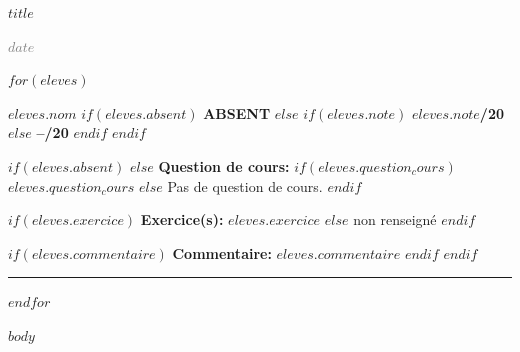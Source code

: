 \documentclass[11pt,a4paper]{article}
\newcommand{\colletitle}{$title$}
\newcommand{\colletitle}{Colle de mathématiques}
\newcommand{\colledate}{$date$}
\newcommand{\colledate}{\today}
\begin{document}

\begin{center}

{\Large\bfseries\color{CPGEblue}\colletitle}


\vspace{0.5em}

{\small\textcolor{gray}{\colledate}}

\end{center}

\vspace{0.7em}


$for(eleves)$

\noindent
\colorbox{CPGElight}{
\parbox{\dimexpr\textwidth-2\fboxsep\relax}{
\textbf{\large $eleves.nom$}
\hfill
$if(eleves.absent)$
\textcolor{CPGEgray}{\textbf{ABSENT}}
$else$
$if(eleves.note)$
\textbf{\large $eleves.note$/20}
$else$
\textbf{\large --/20}
$endif$
$endif$
}}

$if(eleves.absent)$
$else$
\textbf{Question de cours:}
$if(eleves.question_cours)$
$eleves.question_cours$
$else$
\textcolor{CPGEgray}{Pas de question de cours.}
$endif$

\vspace{0.25em}

$if(eleves.exercice)$
\textbf{Exercice(s):}
$eleves.exercice$
$else$
\textcolor{CPGEgray}{non renseigné}
$endif$

\vspace{0.25em}

$if(eleves.commentaire)$
\textbf{Commentaire:}
$eleves.commentaire$
$endif$
$endif$

\vspace{0.5em}
\hrule
\vspace{0.7em}

$endfor$


$body$
\end{document}

